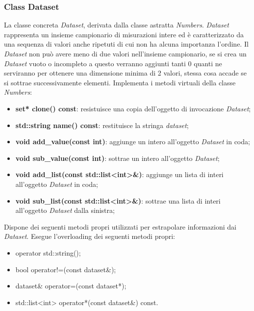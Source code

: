 \documentclass[a4paper,10pt]{article}
\begin{document}
        \subsubsection{Class Dataset}
        La classe concreta \textit{Dataset}, derivata dalla classe astratta \textit{Numbers}. \textit{Dataset} rappresenta un insieme campionario di misurazioni intere ed è caratterizzato da una sequenza di valori anche ripetuti di cui non ha alcuna importanza l’ordine. Il \textit{Dataset} non può avere meno di due valori nell’insieme campionario, se si crea un \textit{Dataset} vuoto o incompleto a questo verranno aggiunti tanti 0 quanti ne serviranno per ottenere una dimensione minima di 2 valori, stessa cosa accade se si sottrae successivamente elementi.
        Implementa i metodi virtuali della classe \textit{Numbers}:
        \begin{itemize}
            \item \textbf{set* clone() const}: resistuisce una copia dell'oggetto di invocazione \textit{Dataset};
            \item \textbf{std::string name() const}: restituisce la stringa \textit{dataset};
            \item \textbf{void add\_value(const int)}: aggiunge un intero all'oggetto \textit{Dataset} in coda;
            \item \textbf{void sub\_value(const int)}: sottrae un intero all'oggetto \textit{Dataset};
            \item \textbf{void add\_list(const std::list<int>\&)}: aggiunge un lista di interi all'oggetto \textit{Dataset} in coda;
            \item \textbf{void sub\_list(const std::list<int>\&)}: sottrae una lista di interi all'oggetto \textit{Dataset} dalla sinistra;
        \end{itemize}
        Dispone dei seguenti metodi propri utilizzati per estrapolare informazioni dai \textit{Dataset}.
        Esegue l'overloading dei seguenti metodi propri:
        \begin{itemize}
            \item operator std::string();
            \item bool operator!=(const dataset\&);
            \item dataset\& operator=(const dataset*);
            \item std::list<int> operator*(const dataset\&) const.
        \end{itemize}
    
\end{document}
